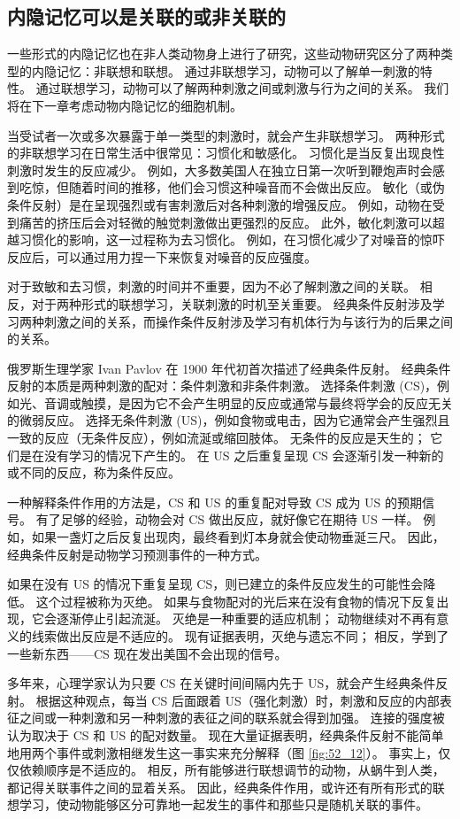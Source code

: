 \subsection{内隐记忆可以是关联的或非关联的}
一些形式的内隐记忆也在非人类动物身上进行了研究，这些动物研究区分了两种类型的内隐记忆：非联想和联想。 通过非联想学习，动物可以了解单一刺激的特性。 通过联想学习，动物可以了解两种刺激之间或刺激与行为之间的关系。 我们将在下一章考虑动物内隐记忆的细胞机制。

当受试者一次或多次暴露于单一类型的刺激时，就会产生非联想学习。 两种形式的非联想学习在日常生活中很常见：习惯化和敏感化。 习惯化是当反复出现良性刺激时发生的反应减少。 例如，大多数美国人在独立日第一次听到鞭炮声时会感到吃惊，但随着时间的推移，他们会习惯这种噪音而不会做出反应。 敏化（或伪条件反射）是在呈现强烈或有害刺激后对各种刺激的增强反应。 例如，动物在受到痛苦的挤压后会对轻微的触觉刺激做出更强烈的反应。 此外，敏化刺激可以超越习惯化的影响，这一过程称为去习惯化。 例如，在习惯化减少了对噪音的惊吓反应后，可以通过用力捏一下来恢复对噪音的反应强度。

对于致敏和去习惯，刺激的时间并不重要，因为不必了解刺激之间的关联。 相反，对于两种形式的联想学习，关联刺激的时机至关重要。 经典条件反射涉及学习两种刺激之间的关系，而操作条件反射涉及学习有机体行为与该行为的后果之间的关系。

俄罗斯生理学家 Ivan Pavlov 在 1900 年代初首次描述了经典条件反射。 经典条件反射的本质是两种刺激的配对：条件刺激和非条件刺激。 选择条件刺激 (CS)，例如光、音调或触摸，是因为它不会产生明显的反应或通常与最终将学会的反应无关的微弱反应。 选择无条件刺激 (US)，例如食物或电击，因为它通常会产生强烈且一致的反应（无条件反应），例如流涎或缩回肢体。 无条件的反应是天生的； 它们是在没有学习的情况下产生的。 在 US 之后重复呈现 CS 会逐渐引发一种新的或不同的反应，称为条件反应。

一种解释条件作用的方法是，CS 和 US 的重复配对导致 CS 成为 US 的预期信号。 有了足够的经验，动物会对 CS 做出反应，就好像它在期待 US 一样。 例如，如果一盏灯之后反复出现肉，最终看到灯本身就会使动物垂涎三尺。 因此，经典条件反射是动物学习预测事件的一种方式。

如果在没有 US 的情况下重复呈现 CS，则已建立的条件反应发生的可能性会降低。 这个过程被称为灭绝。 如果与食物配对的光后来在没有食物的情况下反复出现，它会逐渐停止引起流涎。 灭绝是一种重要的适应机制； 动物继续对不再有意义的线索做出反应是不适应的。 现有证据表明，灭绝与遗忘不同； 相反，学到了一些新东西——CS 现在发出美国不会出现的信号。

多年来，心理学家认为只要 CS 在关键时间间隔内先于 US，就会产生经典条件反射。 根据这种观点，每当 CS 后面跟着 US（强化刺激）时，刺激和反应的内部表征之间或一种刺激和另一种刺激的表征之间的联系就会得到加强。 连接的强度被认为取决于 CS 和 US 的配对数量。 现在大量证据表明，经典条件反射不能简单地用两个事件或刺激相继发生这一事实来充分解释（图 \ref{fig:52_12}）。 事实上，仅仅依赖顺序是不适应的。 相反，所有能够进行联想调节的动物，从蜗牛到人类，都记得关联事件之间的显着关系。 因此，经典条件作用，或许还有所有形式的联想学习，使动物能够区分可靠地一起发生的事件和那些只是随机关联的事件。

